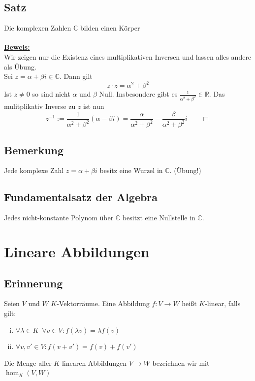 \subsection{Satz} %
\label{sub:satz}
Die komplexen Zahlen $\mathds{C}$ bilden einen Körper \\
\vspace{\baselineskip} \\
\underline{\textbf{Beweis:}} \\
Wir zeigen nur die Existenz eines multiplikativen Inversen und lassen alles andere als Übung. \\
Sei $z= \alpha + \beta i \in \mathds{C}$. Dann gilt
\[
	z \cdot \bar z = \alpha^2 + \beta^2
\]
Ist $z \not= 0$ so sind nicht $\alpha $ und $\beta$ Null. Insbesondere gibt es $\frac{1}{\alpha^2 + \beta^2} \in \mathds{R}$. 
Das mulitplikativ Inverse zu $z$ ist nun 
\[
	z^{-1} := \frac{1}{\alpha^2 + \beta^2} (\alpha -\beta i) = \frac{\alpha}{\alpha^2 + \beta^2} - \frac{\beta}{\alpha^2 + \beta^2} i
	\qquad \Box
\]

\subsection{Bemerkung} %
\label{sub:bemerkung}
Jede komplexe Zahl $z = \alpha + \beta i$ besitz eine Wurzel in $\mathds{C}$. (Übung!)

\subsection{Fundamentalsatz der Algebra} %
\label{sub:fundamentalsatz_der_algebra}
Jedes nicht-konstante Polynom über $\mathds{C}$ besitzt eine Nullstelle in $\mathds{C}.$ \\

\section{Lineare Abbildungen} %
\label{sec:lineare_abbildungen}

\subsection{Erinnerung} %
\label{sub:erinnerung}
Seien $V$ und $W$ $K$-Vektorräume. Eine Abbildung $f : V \to W$ heißt $K$-linear, falls gilt:
\begin{enumerate}[(i)]
	\item $\forall \lambda \in K \enspace \forall v \in V : f(\lambda v)= \lambda f(v)$
	\item $\forall v, v' \in V : f(v +v')= f(v) + f(v')$
\end{enumerate}
Die Menge aller $K$-linearen Abbildungen $V \to W$ bezeichnen wir mit $\hom_K (V,W)$

